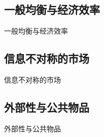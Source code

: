 \documentclass[UTF8]{ctexbeamer}
\begin{document}
\subsection{一般均衡与经济效率}
\begin{frame}{一般均衡与经济效率}
\end{frame}


\subsection{信息不对称的市场}
\begin{frame}{信息不对称的市场}
\end{frame}

\subsection{外部性与公共物品}
\begin{frame}{外部性与公共物品}
\end{frame}


\end{document}
